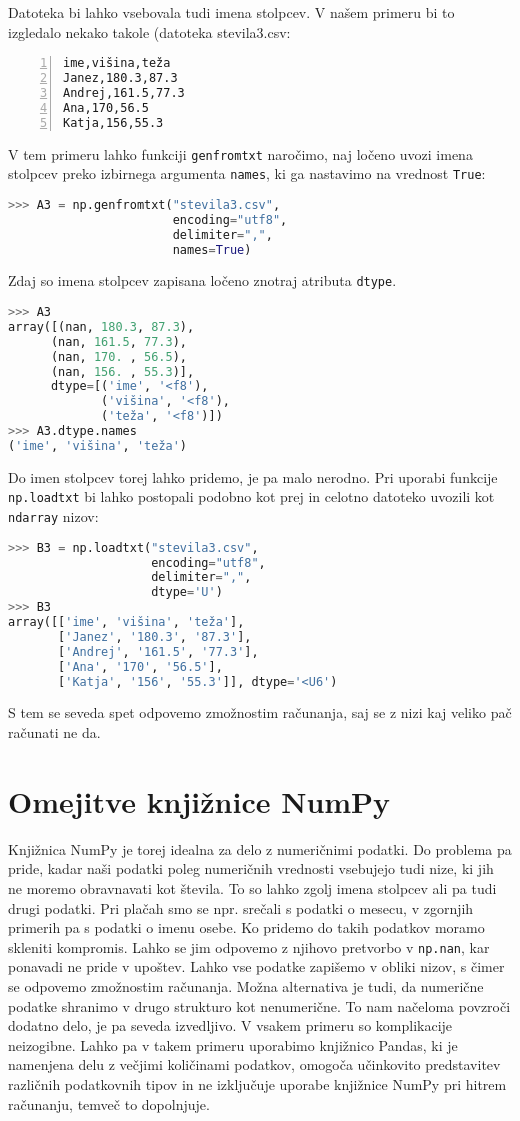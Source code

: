 Datoteka bi lahko vsebovala tudi imena stolpcev. V našem primeru bi to izgledalo nekako takole (datoteka {stevila3.csv}:
\begin{lstlisting}[numbers=left]
ime,višina,teža
Janez,180.3,87.3
Andrej,161.5,77.3
Ana,170,56.5
Katja,156,55.3
\end{lstlisting} 
V tem primeru lahko funkciji \texttt{genfromtxt} naročimo, naj ločeno uvozi imena stolpcev preko izbirnega argumenta \texttt{names}, ki ga nastavimo na vrednost \texttt{True}:
\begin{lstlisting}[language=Python]
>>> A3 = np.genfromtxt("stevila3.csv",
                       encoding="utf8",
                       delimiter=",", 
                       names=True)
\end{lstlisting}
Zdaj so imena stolpcev zapisana ločeno znotraj atributa \texttt{dtype}.
\begin{lstlisting}[language=Python]
>>> A3
array([(nan, 180.3, 87.3), 
      (nan, 161.5, 77.3), 
      (nan, 170. , 56.5),
      (nan, 156. , 55.3)],
      dtype=[('ime', '<f8'), 
             ('višina', '<f8'), 
             ('teža', '<f8')])
>>> A3.dtype.names
('ime', 'višina', 'teža')
\end{lstlisting}
Do imen stolpcev torej lahko pridemo, je pa malo nerodno. Pri uporabi funkcije \texttt{np.loadtxt} bi lahko postopali podobno kot prej in celotno datoteko uvozili kot \texttt{ndarray} nizov:
\begin{lstlisting}[language=Python]
>>> B3 = np.loadtxt("stevila3.csv", 
                    encoding="utf8", 
                    delimiter=",", 
                    dtype='U')
>>> B3
array([['ime', 'višina', 'teža'],
       ['Janez', '180.3', '87.3'],
       ['Andrej', '161.5', '77.3'],
       ['Ana', '170', '56.5'],
       ['Katja', '156', '55.3']], dtype='<U6')
\end{lstlisting}
S tem se seveda spet odpovemo zmožnostim računanja, saj se z nizi kaj veliko pač računati ne da. 

\section{Omejitve knjižnice NumPy}

Knjižnica NumPy je torej idealna za delo z numeričnimi podatki. Do problema pa pride, kadar naši podatki poleg numeričnih vrednosti vsebujejo tudi nize, ki jih ne moremo obravnavati kot števila. To so lahko zgolj imena stolpcev ali pa tudi drugi podatki. Pri plačah smo se npr. srečali s podatki o mesecu, v zgornjih primerih pa s podatki o imenu osebe. Ko pridemo do takih podatkov moramo skleniti kompromis. Lahko se jim odpovemo z njihovo pretvorbo v \texttt{np.nan}, kar ponavadi ne pride v upoštev. Lahko vse podatke zapišemo v obliki nizov, s čimer se odpovemo zmožnostim računanja. Možna alternativa je tudi, da numerične podatke shranimo v drugo strukturo kot nenumerične. To nam načeloma povzroči dodatno delo, je pa seveda izvedljivo. V vsakem primeru so komplikacije neizogibne. Lahko pa v takem primeru uporabimo knjižnico Pandas, ki je namenjena delu z večjimi količinami podatkov, omogoča učinkovito predstavitev različnih podatkovnih tipov in ne izključuje uporabe knjižnice NumPy pri hitrem računanju, temveč to dopolnjuje.
